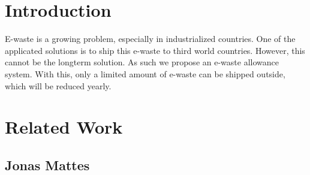\documentclass[sigchi-a, authorversion]{acmart}
\begin{document}

\maketitle

  
  
  




\section{Introduction}
E-waste is a growing problem, especially in industrialized countries. One of the applicated solutions
is to ship this e-waste to third world countries. However, this cannot be the longterm solution. As such
we propose an e-waste allowance system. With this, only a limited amount of e-waste can be shipped outside, 
which will be reduced yearly.

\section{Related Work}

\subsection{Jonas Mattes}
 
\end{document}
